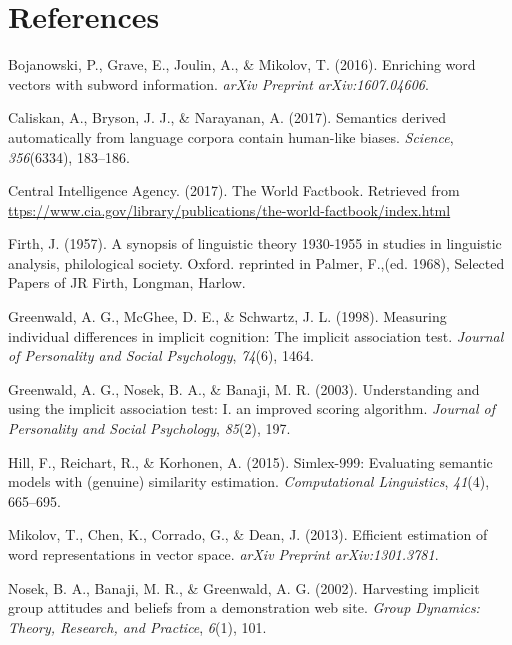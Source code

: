 \documentclass[10pt, letterpaper]{article}
\begin{document}
\section{References}\label{references}

\setlength{\parindent}{-0.1in} \setlength{\leftskip}{0.125in} \noindent

\hypertarget{refs}{}
\hypertarget{ref-bojanowski2016enriching}{}
Bojanowski, P., Grave, E., Joulin, A., \& Mikolov, T. (2016). Enriching
word vectors with subword information. \emph{arXiv Preprint
arXiv:1607.04606}.

\hypertarget{ref-caliskan2017semantics}{}
Caliskan, A., Bryson, J. J., \& Narayanan, A. (2017). Semantics derived
automatically from language corpora contain human-like biases.
\emph{Science}, \emph{356}(6334), 183--186.

\hypertarget{ref-ciafactbook}{}
Central Intelligence Agency. (2017). The World Factbook. Retrieved from
\url{ttps://www.cia.gov/library/publications/the-world-factbook/index.html}

\hypertarget{ref-firth1957synopsis}{}
Firth, J. (1957). A synopsis of linguistic theory 1930-1955 in studies
in linguistic analysis, philological society. Oxford. reprinted in
Palmer, F.,(ed. 1968), Selected Papers of JR Firth, Longman, Harlow.

\hypertarget{ref-greenwald1998measuring}{}
Greenwald, A. G., McGhee, D. E., \& Schwartz, J. L. (1998). Measuring
individual differences in implicit cognition: The implicit association
test. \emph{Journal of Personality and Social Psychology}, \emph{74}(6),
1464.

\hypertarget{ref-greenwald2003understanding}{}
Greenwald, A. G., Nosek, B. A., \& Banaji, M. R. (2003). Understanding
and using the implicit association test: I. an improved scoring
algorithm. \emph{Journal of Personality and Social Psychology},
\emph{85}(2), 197.

\hypertarget{ref-hill2015simlex}{}
Hill, F., Reichart, R., \& Korhonen, A. (2015). Simlex-999: Evaluating
semantic models with (genuine) similarity estimation.
\emph{Computational Linguistics}, \emph{41}(4), 665--695.

\hypertarget{ref-mikolov2013efficient}{}
Mikolov, T., Chen, K., Corrado, G., \& Dean, J. (2013). Efficient
estimation of word representations in vector space. \emph{arXiv Preprint
arXiv:1301.3781}.

\hypertarget{ref-nosek2002harvesting}{}
Nosek, B. A., Banaji, M. R., \& Greenwald, A. G. (2002). Harvesting
implicit group attitudes and beliefs from a demonstration web site.
\emph{Group Dynamics: Theory, Research, and Practice}, \emph{6}(1), 101.
\end{document}
